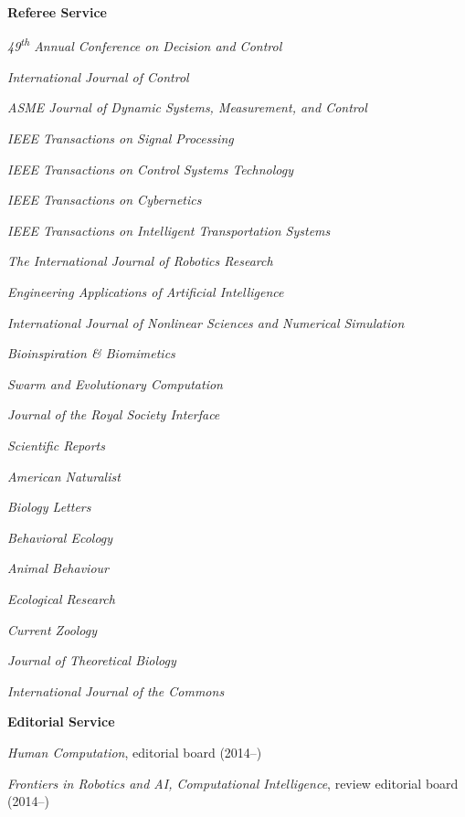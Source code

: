 \documentclass[10pt]{article}
\newcommand{\halfblankline}{\quad\vspace{-0.5\baselineskip}\pagebreak[3]}
\begin{document}
\textbf{Referee Service}
\begin{innerlist}
    \item \emph{49\textsuperscript{th} Annual Conference on Decision and Control}
    \item \emph{International Journal of Control}
    \item \emph{ASME Journal of Dynamic Systems, Measurement, and Control}
    \item \emph{IEEE Transactions on Signal Processing}
    \item \emph{IEEE Transactions on Control Systems Technology}
    \item \emph{IEEE Transactions on Cybernetics}
    \item \emph{IEEE Transactions on Intelligent Transportation Systems}
    \item \emph{The International Journal of Robotics Research}
    \item \emph{Engineering Applications of Artificial Intelligence}
    \item \emph{International Journal of Nonlinear Sciences and Numerical Simulation}
    \item \emph{Bioinspiration \& Biomimetics}
    \item \emph{Swarm and Evolutionary Computation}
    \item \emph{Journal of the Royal Society Interface}
    \item \emph{Scientific Reports}
    \item \emph{American Naturalist}
    \item \emph{Biology Letters}
    \item \emph{Behavioral Ecology}
    \item \emph{Animal Behaviour}
    \item \emph{Ecological Research}
    \item \emph{Current Zoology}
    \item \emph{Journal of Theoretical Biology}
    \item \emph{International Journal of the Commons}
\end{innerlist}

\halfblankline

\textbf{Editorial Service}
\begin{innerlist}
    \item \emph{Human Computation}, editorial board (2014--)
    \item \emph{Frontiers in Robotics and AI, Computational Intelligence}, review editorial board (2014--)
\end{innerlist}
\end{document}
